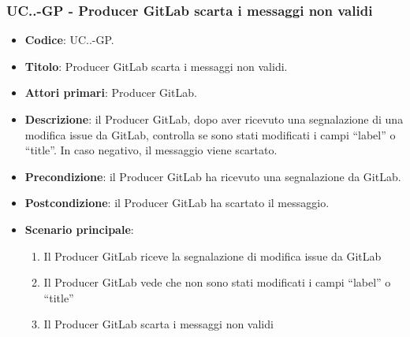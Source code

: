 		\subsubsection{UC\theuccount.\thesubuccount.\thesubsubuccount-GP - Producer GitLab scarta i messaggi non validi}
			
			\begin{itemize}
				\item \textbf{Codice}: UC\theuccount.\thesubuccount.\thesubsubuccount-GP.
				\item \textbf{Titolo}: Producer GitLab scarta i messaggi non validi.
				\item \textbf{Attori primari}: Producer GitLab.
				\item \textbf{Descrizione}: il Producer GitLab, dopo aver ricevuto una segnalazione di una modifica issue da GitLab, controlla
				se sono stati modificati i campi ``label'' o ``title''. In caso negativo, il messaggio viene scartato.
				\item \textbf{Precondizione}: il Producer GitLab ha ricevuto una segnalazione da GitLab.
				\item \textbf{Postcondizione}: il Producer GitLab ha scartato il messaggio.
				\item \textbf{Scenario principale}: 
				\begin{enumerate}
					\item Il Producer GitLab riceve la segnalazione di modifica issue da GitLab
					\item Il Producer GitLab vede che non sono stati modificati i campi ``label'' o ``title''
					\item Il Producer GitLab scarta i messaggi non validi
				\end{enumerate}
			\end{itemize}